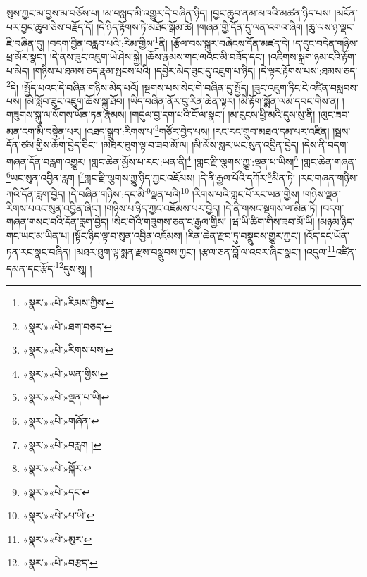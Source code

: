 སུས་ཀྱང་མ་བྱས་མ་བཅོས་པ། །མ་བསླད་མི་འགྱུར་དེ་བཞིན་ཉིད། །བྱང་ཆུབ་ནམ་མཁའི་མཚན་ཉིད་པས། །མངོན་པར་བྱང་ཆུབ་ཅེས་བརྗོད་དོ། །དེ་ཉིད་རྟོགས་ཏེ་མཐོང་སྒོམ་ཚེ། །གཞན་གྱི་དོན་དུ་ལན་འགའ་ཞིག །ཆུ་ལས་ཉ་ལྡང་ཇི་བཞིན་དུ། །བདག་བྱིན་བརླབ་པའི་:རིམ་གྱིས་\footnote{«སྣར་»«པེ་»རིམས་ཀྱིས་}ནི། །རྩོལ་བས་སྐུར་བཞེངས་དོན་མཛད་དེ། །ད་དུང་བདེན་གཉིས་ཕྲ་མོར་སྣང་། །དེ་ནས་ཟུང་འཇུག་ཡེ་ཤེས་སྐྱེ། །ཆོས་རྣམས་གང་ལའང་མི་བཟོད་དང་། །འཇིགས་སྐྲག་ཉམ་ངའི་རྟོག་པ་མེད། །གཉིས་པ་ཐམས་ཅད་རྣམ་སྤངས་པའི། །དབྱེར་མེད་ཟུང་དུ་འཇུག་པ་ཉིད། །དེ་ལྟར་རྟོགས་པས་:ཐམས་ཅད་\footnote{«སྣར་»«པེ་»ཐག་བཅད་}དེ། །སྤྱོད་པའང་དེ་བཞིན་གཉིས་མེད་པའོ། །སྔགས་པས་སེང་གེ་བཞིན་དུ་སྤྱོད། །ཟུང་འཇུག་ཏིང་ངེ་འཛིན་བསླབས་པས། །མི་སློབ་ཟུང་འཇུག་ཆོས་སྐུ་ཐོབ། །ཡིད་བཞིན་ནོར་བུ་རིན་ཆེན་ལྟར། །མི་རྟོག་སྨོན་ལམ་དབང་གིས་ན། །གཟུགས་སྐུ་ལ་སོགས་ཡོན་ཏན་རྣམས། །གདུལ་བྱ་དག་པའི་ངོ་ལ་སྣང་། །མ་རུངས་ཕྱི་མའི་དུས་སུ་ནི། །ལུང་ཟབ་མན་ངག་མི་བསྟེན་པར། །འཐད་སྒྲུབ་:རིགས་པ་\footnote{«སྣར་»«པེ་»རིགས་པས་}གཙོར་བྱེད་པས། །རང་རང་གྲུབ་མཐའ་དམ་པར་འཛིན། །སྦས་དོན་ཙམ་གྱིས་ཆོག་བྱེད་ཅིང་། །མཐར་ཐུག་ལྟ་བ་ཟབ་མོ་ལ། །མི་མོས་སླར་ཡང་སུན་འབྱིན་བྱེད། །དེས་ནི་བདག་གཞན་དོན་བརླག་འགྱུར། །གླང་ཆེན་མྱོས་པ་རང་:ཡན་ནི།\footnote{«སྣར་»«པེ་»ཡན་གྱིས།} །གླང་རྫི་ལྕགས་ཀྱུ་:ལྡན་པ་ཡིས།\footnote{«སྣར་»«པེ་»ལྡན་པ་ཡི།} །གླང་ཆེན་གཞན་\footnote{«སྣར་»«པེ་»གཞོན་}ཡང་སུན་འབྱིན་རླག །\footnote{«སྣར་»«པེ་»བརླག །}གླང་རྫི་ལྕགས་ཀྱུ་ཉིད་ཀྱང་འཇོམས། །དེ་ནི་རྒྱལ་པོའི་དཀོར་\footnote{«སྣར་»«པེ་»སྐོར་}མིན་ཏེ། །རང་གཞན་གཉིས་ཀའི་དོན་རླག་བྱེད། །དེ་བཞིན་གཉིས་:དང་མི་\footnote{«སྣར་»«པེ་»དང་}ལྡན་པའི།\footnote{«སྣར་»«པེ་»པ་ཡི།} །རིགས་པའི་གླང་པོ་རང་ཡན་གྱིས། །གཉིས་ལྡན་རིགས་པའང་སུན་འབྱིན་ཞིང་། །གཉིས་པ་ཉིད་ཀྱང་འཇོམས་པར་བྱེད། །དེ་ནི་གསང་སྔགས་ལ་མིན་ཏེ། །བདག་གཞན་གསང་བའི་དོན་རླག་བྱེད། །སེང་གེའི་གཟུགས་ཅན་ང་རྒྱལ་གྱིས། །ཝ་ཡི་ཚིག་གིས་ཟབ་མོ་ཡི། །མཉམ་ཉིད་གང་ཡང་མ་ཡིན་པ། །སྟོང་ཉིད་ལྟ་བ་སུན་འབྱིན་འཇོམས། །རིན་ཆེན་རྫབ་ཏུ་བསྣུབས་གྱུར་ཀྱང་། །འོད་དང་ཡོན་ཏན་རང་སྣང་བཞིན། །མཐར་ཐུག་ལྟ་སྨན་རྫས་བསྣུབས་ཀྱང་། །རྩལ་ཅན་བློ་ལ་འབར་ཞིང་སྣང་། །འདུལ་\footnote{«སྣར་»«པེ་»མུར་}འཛིན་དམན་དང་རྩོད་\footnote{«སྣར་»«པེ་»བརྩད་}དུས་སུ། །
